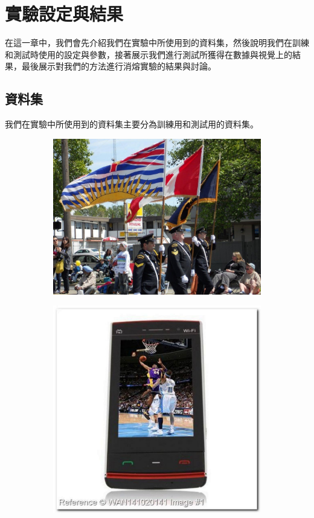 \chapter{實驗設定與結果}
\label{c:experiment}

在這一章中，我們會先介紹我們在實驗中所使用到的資料集，然後說明我們在訓練和測試時使用的設定與參數，接著展示我們進行測試所獲得在數據與視覺上的結果，最後展示對我們的方法進行消熔實驗的結果與討論。

\section{資料集}

我們在實驗中所使用到的資料集主要分為訓練用和測試用的資料集。

\begin{figure}[t]
\centering
\begin{subfigure}[b]{0.3\textwidth}
    \includegraphics[width=\textwidth]{figures/wider_1}
\end{subfigure}
\begin{subfigure}[b]{0.3\textwidth}
    \includegraphics[width=\textwidth]{figures/wider_2}

\end{subfigure}
\end{figure}
